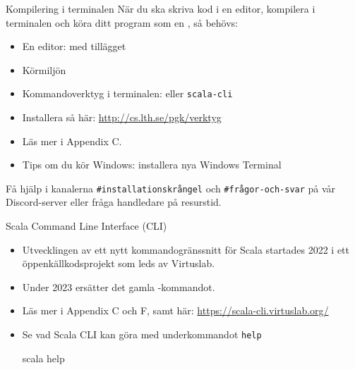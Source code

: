 
\begin{Slide}{Kompilering i terminalen}
  När du ska skriva kod i en editor, kompilera i terminalen och köra ditt program som en , så behövs: 
  \begin{itemize}
    \item En editor:  med tillägget 
    \item Körmiljön  
    \item Kommandoverktyg i terminalen:  eller \texttt{scala-cli}
    \item Installera så här: \url{http://cs.lth.se/pgk/verktyg}
    \item Läs mer i Appendix C.
    \item Tips om du kör Windows: installera %
    {nya Windows Terminal}

  \end{itemize}
    Få hjälp i kanalerna \texttt{\#installationskrångel} och \texttt{\#frågor-och-svar} på vår Discord-server eller fråga handledare på resurstid.
  
\end{Slide}

\begin{Slide}{Scala Command Line Interface (CLI)}
\begin{itemize}
\item Utvecklingen av ett nytt kommandogränssnitt  för Scala startades 2022 i ett öppenkällkodsprojekt som leds av Virtuslab. 
\item Under 2023 ersätter  det gamla -kommandot.%
\item Läs mer i Appendix C och F, samt här: \url{https://scala-cli.virtuslab.org/}
\item Se vad Scala CLI kan göra med underkommandot \texttt{help}
\begin{REPLnonum}
scala help
\end{REPLnonum}
\end{itemize}
\end{Slide}

